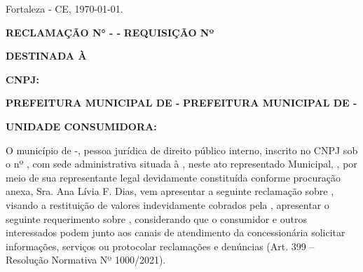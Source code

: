 \begin{flushright}
Fortaleza - CE, \today.
\end{flushright}

\ifnum{}
\textbf{RECLAMAÇÃO N° \numReclamacao{} - \nomeMunicipioMaisculo{} - \siglaEstado{}}
\else
\textbf{REQUISIÇÃO Nº \numReclamacao{}}
\fi

\textbf{DESTINADA À \nomeConcessionaria{}}

\textbf{CNPJ: \cnpjConcessionaria{}}

\ifnum{}
\textbf{PREFEITURA MUNICIPAL DE \nomeMunicipioMaisculo{} - \siglaEstado{}}
\else
\textbf{PREFEITURA MUNICIPAL DE \nomeMunicipioMaisculo{} - \siglaEstado{}}
\fi

\ifnum{}
\textbf{UNIDADE CONSUMIDORA: \unidadeConsumidora{}}
\fi

\vspace{0.5cm}

O município de \nomeMunicipio{}-\siglaEstado{}, pessoa jurídica de direito público interno, inscrito no CNPJ sob o nº \cnpjMunicipio{}, com sede administrativa situada à \sedePrefeitura{}, neste ato representado \generoPrefeitura{} Municipal, \nomePrefeito{}, por meio de sua representante legal devidamente constituída conforme procuração anexa, Sra. Ana Lívia F. Dias, vem
\ifnum{}
apresentar a seguinte reclamação sobre \tituloDocumento{}, visando a restituição de valores indevidamente cobrados pela \nomeConcessionaria{}, 
\else
apresentar o seguinte requerimento sobre \tituloDocumento{}, 
\fi
considerando que o consumidor e outros interessados podem junto aos canais de atendimento da concessionária solicitar informações, serviços ou protocolar reclamações e denúncias (Art. 399 -- Resolução Normativa Nº 1000/2021).
